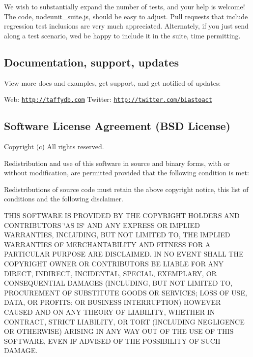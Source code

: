 We wish to substantially expand the number of tests, and your help is welcome! The code, {\ttfamily nodeunit\+\_\+suite.\+js}, should be easy to adjust. Pull requests that include regression test inclusions are very much appreciated. Alternately, if you just send along a test scenario, we\textquotesingle{}d be happy to include it in the suite, time permitting.

\subsection*{Documentation, support, updates}

View more docs and examples, get support, and get notified of updates\+:

Web\+: \href{http://taffydb.com}{\tt http\+://taffydb.\+com} Twitter\+: \href{http://twitter.com/biastoact}{\tt http\+://twitter.\+com/biastoact}

\subsection*{Software License Agreement (B\+SD License)}

Copyright (c) All rights reserved.

Redistribution and use of this software in source and binary forms, with or without modification, are permitted provided that the following condition is met\+:


\begin{DoxyItemize}
\item Redistributions of source code must retain the above copyright notice, this list of conditions and the following disclaimer.
\end{DoxyItemize}

T\+H\+IS S\+O\+F\+T\+W\+A\+RE IS P\+R\+O\+V\+I\+D\+ED BY T\+HE C\+O\+P\+Y\+R\+I\+G\+HT H\+O\+L\+D\+E\+RS A\+ND C\+O\+N\+T\+R\+I\+B\+U\+T\+O\+RS \char`\"{}\+A\+S I\+S\char`\"{} A\+ND A\+NY E\+X\+P\+R\+E\+SS OR I\+M\+P\+L\+I\+ED W\+A\+R\+R\+A\+N\+T\+I\+ES, I\+N\+C\+L\+U\+D\+I\+NG, B\+UT N\+OT L\+I\+M\+I\+T\+ED TO, T\+HE I\+M\+P\+L\+I\+ED W\+A\+R\+R\+A\+N\+T\+I\+ES OF M\+E\+R\+C\+H\+A\+N\+T\+A\+B\+I\+L\+I\+TY A\+ND F\+I\+T\+N\+E\+SS F\+OR A P\+A\+R\+T\+I\+C\+U\+L\+AR P\+U\+R\+P\+O\+SE A\+RE D\+I\+S\+C\+L\+A\+I\+M\+ED. IN NO E\+V\+E\+NT S\+H\+A\+LL T\+HE C\+O\+P\+Y\+R\+I\+G\+HT O\+W\+N\+ER OR C\+O\+N\+T\+R\+I\+B\+U\+T\+O\+RS BE L\+I\+A\+B\+LE F\+OR A\+NY D\+I\+R\+E\+CT, I\+N\+D\+I\+R\+E\+CT, I\+N\+C\+I\+D\+E\+N\+T\+AL, S\+P\+E\+C\+I\+AL, E\+X\+E\+M\+P\+L\+A\+RY, OR C\+O\+N\+S\+E\+Q\+U\+E\+N\+T\+I\+AL D\+A\+M\+A\+G\+ES (I\+N\+C\+L\+U\+D\+I\+NG, B\+UT N\+OT L\+I\+M\+I\+T\+ED TO, P\+R\+O\+C\+U\+R\+E\+M\+E\+NT OF S\+U\+B\+S\+T\+I\+T\+U\+TE G\+O\+O\+DS OR S\+E\+R\+V\+I\+C\+ES; L\+O\+SS OF U\+SE, D\+A\+TA, OR P\+R\+O\+F\+I\+TS; OR B\+U\+S\+I\+N\+E\+SS I\+N\+T\+E\+R\+R\+U\+P\+T\+I\+ON) H\+O\+W\+E\+V\+ER C\+A\+U\+S\+ED A\+ND ON A\+NY T\+H\+E\+O\+RY OF L\+I\+A\+B\+I\+L\+I\+TY, W\+H\+E\+T\+H\+ER IN C\+O\+N\+T\+R\+A\+CT, S\+T\+R\+I\+CT L\+I\+A\+B\+I\+L\+I\+TY, OR T\+O\+RT (I\+N\+C\+L\+U\+D\+I\+NG N\+E\+G\+L\+I\+G\+E\+N\+CE OR O\+T\+H\+E\+R\+W\+I\+SE) A\+R\+I\+S\+I\+NG IN A\+NY W\+AY O\+UT OF T\+HE U\+SE OF T\+H\+IS S\+O\+F\+T\+W\+A\+RE, E\+V\+EN IF A\+D\+V\+I\+S\+ED OF T\+HE P\+O\+S\+S\+I\+B\+I\+L\+I\+TY OF S\+U\+CH D\+A\+M\+A\+GE. 